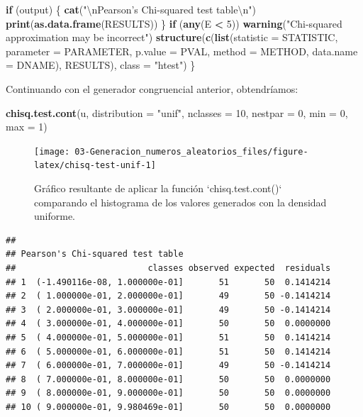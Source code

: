 \documentclass[
]{book}
\newenvironment{Shaded}{\begin{snugshade}}{\end{snugshade}}
\newcommand{\CharTok}[1]{\textcolor[rgb]{0.31,0.60,0.02}{#1}}
\newcommand{\ControlFlowTok}[1]{\textcolor[rgb]{0.13,0.29,0.53}{\textbf{#1}}}
\newcommand{\DataTypeTok}[1]{\textcolor[rgb]{0.13,0.29,0.53}{#1}}
\newcommand{\DecValTok}[1]{\textcolor[rgb]{0.00,0.00,0.81}{#1}}
\newcommand{\KeywordTok}[1]{\textcolor[rgb]{0.13,0.29,0.53}{\textbf{#1}}}
\newcommand{\NormalTok}[1]{#1}
\newcommand{\OperatorTok}[1]{\textcolor[rgb]{0.81,0.36,0.00}{\textbf{#1}}}
\newcommand{\StringTok}[1]{\textcolor[rgb]{0.31,0.60,0.02}{#1}}
\theoremstyle{break}
\theoremstyle{definition}
\theoremstyle{definition}
\theoremstyle{definition}
\theoremstyle{remark}
\begin{document}
\begin{Shaded}
\begin{Highlighting}[]
    \ControlFlowTok{if}\NormalTok{ (output) \{}
        \KeywordTok{cat}\NormalTok{(}\StringTok{"}\CharTok{\textbackslash{}n}\StringTok{Pearson's Chi-squared test table}\CharTok{\textbackslash{}n}\StringTok{"}\NormalTok{)}
        \KeywordTok{print}\NormalTok{(}\KeywordTok{as.data.frame}\NormalTok{(RESULTS))}
\NormalTok{    \}}
    \ControlFlowTok{if}\NormalTok{ (}\KeywordTok{any}\NormalTok{(E }\OperatorTok{<}\StringTok{ }\DecValTok{5}\NormalTok{)) }
        \KeywordTok{warning}\NormalTok{(}\StringTok{"Chi-squared approximation may be incorrect"}\NormalTok{)}
    \KeywordTok{structure}\NormalTok{(}\KeywordTok{c}\NormalTok{(}\KeywordTok{list}\NormalTok{(}\DataTypeTok{statistic =}\NormalTok{ STATISTIC, }\DataTypeTok{parameter =}\NormalTok{ PARAMETER, }\DataTypeTok{p.value =}\NormalTok{ PVAL, }
        \DataTypeTok{method =}\NormalTok{ METHOD, }\DataTypeTok{data.name =}\NormalTok{ DNAME), RESULTS), }\DataTypeTok{class =} \StringTok{"htest"}\NormalTok{)}
\NormalTok{\}}
\end{Highlighting}
\end{Shaded}

Continuando con el generador congruencial anterior, obtendríamos:

\begin{Shaded}
\begin{Highlighting}[]
\KeywordTok{chisq.test.cont}\NormalTok{(u, }\DataTypeTok{distribution =} \StringTok{"unif"}\NormalTok{, }
                \DataTypeTok{nclasses =} \DecValTok{10}\NormalTok{, }\DataTypeTok{nestpar =} \DecValTok{0}\NormalTok{, }\DataTypeTok{min =} \DecValTok{0}\NormalTok{, }\DataTypeTok{max =} \DecValTok{1}\NormalTok{)}
\end{Highlighting}
\end{Shaded}

\begin{figure}[!htb]

{\centering \texttt{[image: 03-Generacion\_numeros\_aleatorios\_files/figure-latex/chisq-test-unif-1]} 

}

\caption{Gráfico resultante de aplicar la función `chisq.test.cont()` comparando el histograma de los valores generados con la densidad uniforme.}\label{fig:chisq-test-unif}
\end{figure}

\begin{verbatim}
## 
## Pearson's Chi-squared test table
##                          classes observed expected  residuals
## 1  (-1.490116e-08, 1.000000e-01]       51       50  0.1414214
## 2  ( 1.000000e-01, 2.000000e-01]       49       50 -0.1414214
## 3  ( 2.000000e-01, 3.000000e-01]       49       50 -0.1414214
## 4  ( 3.000000e-01, 4.000000e-01]       50       50  0.0000000
## 5  ( 4.000000e-01, 5.000000e-01]       51       50  0.1414214
## 6  ( 5.000000e-01, 6.000000e-01]       51       50  0.1414214
## 7  ( 6.000000e-01, 7.000000e-01]       49       50 -0.1414214
## 8  ( 7.000000e-01, 8.000000e-01]       50       50  0.0000000
## 9  ( 8.000000e-01, 9.000000e-01]       50       50  0.0000000
## 10 ( 9.000000e-01, 9.980469e-01]       50       50  0.0000000
\end{verbatim}
\end{document}
